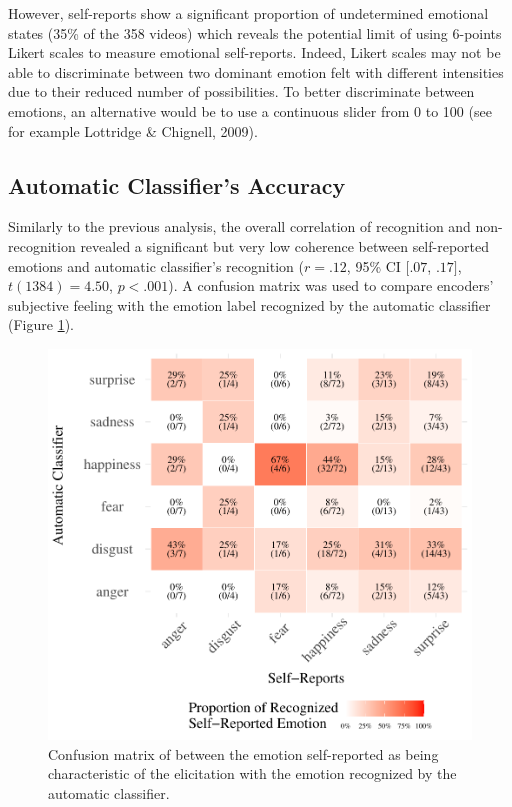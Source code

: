 \documentclass[
  english,
  doc]{apa7}
\begin{document}
However, self-reports show a significant proportion of undetermined emotional states (35\% of the 358 videos) which reveals the potential limit of using 6-points Likert scales to measure emotional self-reports. Indeed, Likert scales may not be able to discriminate between two dominant emotion felt with different intensities due to their reduced number of possibilities. To better discriminate between emotions, an alternative would be to use a continuous slider from 0 to 100 (see for example Lottridge \& Chignell, 2009).

\hypertarget{automatic-classifiers-accuracy}{%
\subsection{Automatic Classifier's Accuracy}\label{automatic-classifiers-accuracy}}

Similarly to the previous analysis, the overall correlation of recognition and non-recognition revealed a significant but very low coherence between self-reported emotions and automatic classifier's recognition (\(r = .12\), 95\% CI \([.07\), \(.17]\), \(t(1384) = 4.50\), \(p < .001\)). A confusion matrix was used to compare encoders' subjective feeling with the emotion label recognized by the automatic classifier (Figure \ref{fig:confusionMatrix-sr-ar}).

\begin{figure}[!h]
\includegraphics[width=\textwidth]{manuscript_apa_files/figure-latex/confusionMatrix-sr-ar-1} \caption{Confusion matrix of between the emotion self-reported as being characteristic of the elicitation with the emotion recognized by the automatic classifier.}\label{fig:confusionMatrix-sr-ar}
\end{figure}
\end{document}
